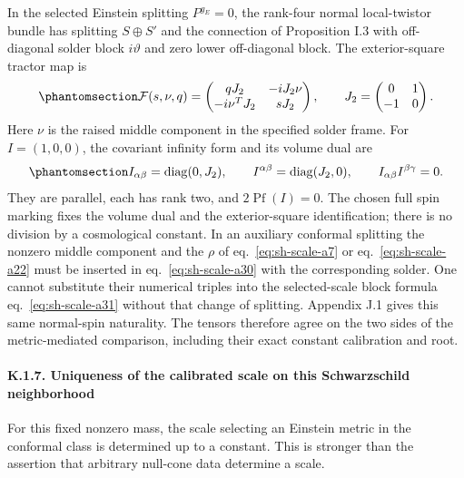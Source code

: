 \documentclass[
  english,
  11pt,
  reqno]{amsart}
\begin{document}
In the selected Einstein splitting \(P^{g_E}=0\), the rank-four normal
local-twistor bundle has splitting \(S\oplus S'\) and the connection of
Proposition I.3 with off-diagonal solder block \(i\vartheta\) and zero
lower off-diagonal block. The exterior-square tractor map is
\begin{equation}\protect\phantomsection\label{eq:sh-scale-a30}{
\mathcal F(s,\nu,q)=
\begin{pmatrix}qJ_2&-iJ_2\nu\\-i\nu^TJ_2&sJ_2\end{pmatrix},
\qquad
J_2=\begin{pmatrix}0&1\\-1&0\end{pmatrix}.
}\end{equation} Here \(\nu\) is the raised middle component in the
specified solder frame. For \(I=(1,0,0)\), the covariant infinity form
and its volume dual are
\begin{equation}\protect\phantomsection\label{eq:sh-scale-a31}{
I_{\alpha\beta}=\operatorname{diag}(0,J_2),\qquad
I^{\alpha\beta}=\operatorname{diag}(J_2,0),\qquad
I_{\alpha\beta}I^{\beta\gamma}=0.
}\end{equation} They are parallel, each has rank two, and
\(2\operatorname{Pf}(I)=0\). The chosen full spin marking fixes the
volume dual and the exterior-square identification; there is no division
by a cosmological constant. In an auxiliary conformal splitting the
nonzero middle component and the \(\rho\) of eq.~\ref{eq:sh-scale-a7} or
eq.~\ref{eq:sh-scale-a22} must be inserted in eq.~\ref{eq:sh-scale-a30}
with the corresponding solder. One cannot substitute their numerical
triples into the selected-scale block formula eq.~\ref{eq:sh-scale-a31}
without that change of splitting. Appendix J.1 gives this same
normal-spin naturality. The tensors therefore agree on the two sides of
the metric-mediated comparison, including their exact constant
calibration and root.

\protect{}\label{sec:sh-scale-7}

\paragraph{K.1.7. Uniqueness of the calibrated scale on this
Schwarzschild
neighborhood}\label{k.1.7.-uniqueness-of-the-calibrated-scale-on-this-schwarzschild-neighborhood}

For this fixed nonzero mass, the scale selecting an Einstein metric in
the conformal class is determined up to a constant. This is stronger
than the assertion that arbitrary null-cone data determine a scale.
\end{document}
